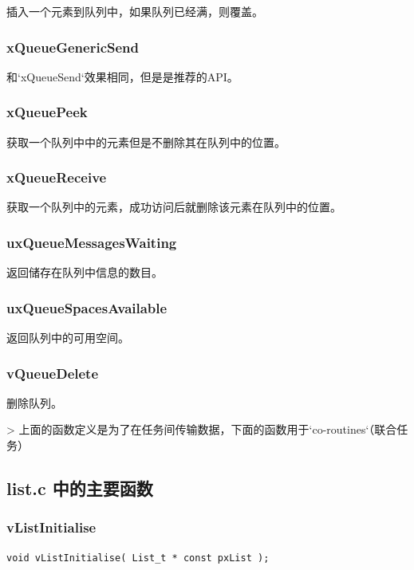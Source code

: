 \documentclass[12pt, a4paper]{article}
\begin{document}
插入一个元素到队列中，如果队列已经满，则覆盖。

\subsubsection {xQueueGenericSend}

和`xQueueSend`效果相同，但是是推荐的API。

\subsubsection {xQueuePeek}

获取一个队列中中的元素但是不删除其在队列中的位置。

\subsubsection {xQueueReceive}

获取一个队列中的元素，成功访问后就删除该元素在队列中的位置。

\subsubsection {uxQueueMessagesWaiting}

返回储存在队列中信息的数目。

\subsubsection {uxQueueSpacesAvailable}

返回队列中的可用空间。

\subsubsection {vQueueDelete}

删除队列。

> 上面的函数定义是为了在任务间传输数据，下面的函数用于`co-routines`（联合任务）

\subsection {list.c 中的主要函数}

\subsubsection {vListInitialise}

\begin{lstlisting}[language={[ANSI]C},keywordstyle=\color{blue!70},commentstyle=\color{red!50!green!50!blue!50},frame=shadowbox, rulesepcolor=\color{red!20!green!20!blue!20}]
void vListInitialise( List_t * const pxList );
\end{lstlisting}
\end{document}
